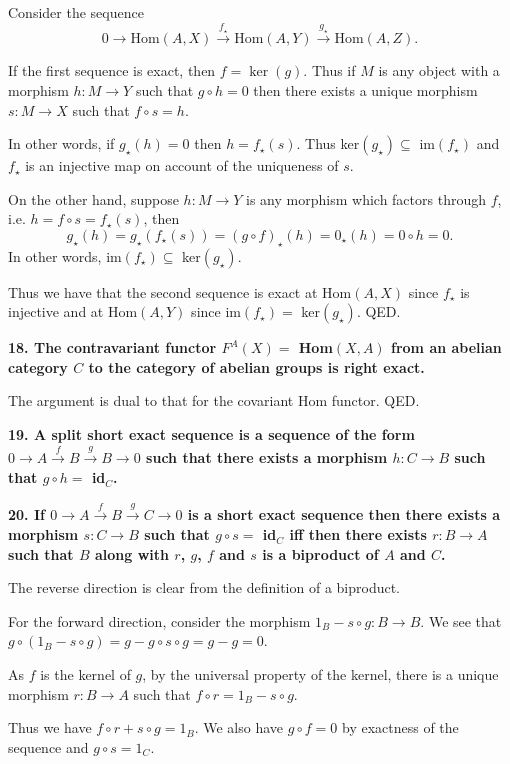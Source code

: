 \documentclass[12pt]{article}
\begin{document}
Consider the sequence
$$0 \rightarrow \mbox{Hom}(A, X) \overset{f_{\star}}{\rightarrow} \mbox{Hom}(A, Y) \overset{g_{\star}}{\rightarrow} \mbox{Hom}(A, Z).$$

If the first sequence is exact, then $f = \ker(g)$. Thus if $M$ is any object with a morphism $h : M \to Y$ such that $g\circ h = 0$ then there exists a unique morphism $s : M \to X$ such that $f\circ s = h$.

In other words, if $g_{\star}(h) = 0$ then $h = f_{\star}(s)$. Thus ker$(g_{\star}) \subseteq$ im$(f_{\star})$ and $f_{\star}$ is an injective map on account of the uniqueness of $s$.

On the other hand, suppose $h : M \to Y$ is any morphism which factors through $f$, i.e. $h = f\circ s = f_{\star}(s)$, then $$g_{\star}(h) = g_{\star}(f_{\star}(s)) = (g\circ f)_{\star}(h) = 0_{\star}(h) = 0\circ h = 0.$$ 
In other words, im$(f_{\star}) \subseteq$ ker$(g_{\star})$.

Thus we have that the second sequence is exact at Hom$(A, X)$ since $f_{\star}$ is injective and at Hom$(A, Y)$ since im$(f_{\star}) =$ ker$(g_{\star})$. QED.

\textbf{18. The contravariant functor $F^A(X) =$ Hom$(X, A)$ from an abelian category $C$ to the category of abelian groups is right exact.}

The argument is dual to that for the covariant Hom functor. QED.

\textbf{19. A split short exact sequence is a sequence of the form $0 \rightarrow A \overset{f}{\rightarrow} B \overset{g}{\rightarrow} B \to 0$ such that there exists a morphism $h : C \to B$ such that $g\circ h =$ id$_C$.}

\textbf{20. If $0 \rightarrow A \overset{f}{\rightarrow} B \overset{g}{\rightarrow} C \to 0$ is a short exact sequence then there exists a morphism $s : C \to B$ such that $g\circ s =$ id$_C$ iff then there exists $r : B \to A$ such that $B$ along with $r$, $g$, $f$ and $s$ is a biproduct of $A$ and $C$.}

The reverse direction is clear from the definition of a biproduct.

For the forward direction, consider the morphism $1_B - s\circ g : B \to B$. We see that $g\circ (1_B - s\circ g) = g - g\circ s\circ g = g - g = 0$.

As $f$ is the kernel of $g$, by the universal property of the kernel, there is a unique morphism $r : B \to A$ such that $f\circ r = 1_B - s\circ g$.

Thus we have $f\circ r + s\circ g = 1_B$. We also have $g\circ f = 0$ by exactness of the sequence and $g\circ s = 1_C$.
\end{document}

